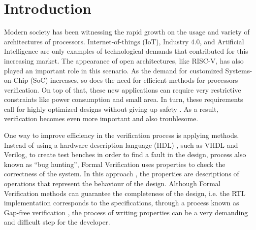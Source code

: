 \chapter{Introduction}

Modern society has been witnessing the rapid growth on the usage and variety of architectures of processors. Internet-of-things (IoT), Industry 4.0, and Artificial Intelligence are only examples of technological demands that contributed for this increasing market. The appearance of open architectures, like RISC-V, has also played an important role in this scenario. As the demand for customized Systems-on-Chip (SoC) increases, so does the need for efficient methods for processors verification. On top of that, these new applications can require very restrictive constraints like power consumption  and small area. In turn, these requirements call for highly optimized designs without giving up safety . As a result, verification becomes even more important and also troublesome. 

One way to improve efficiency in the verification process is applying  methods. Instead of using a hardware description language (HDL) , such as VHDL and Verilog, to create test benches in order to find a fault in the design, process also known as “bug hunting”,  Formal Verification uses properties to check the correctness of the system. In this approach , the properties are descriptions of operations that represent the behaviour of the design. Although Formal Verification methods can guarantee the completeness  of the design, i.e. the RTL implementation corresponds to the specifications, through a process known as Gap-free verification , the process of writing properties can be a very demanding and difficult step for the developer. 

